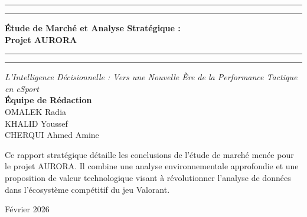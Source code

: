 \documentclass[a4paper,11pt]{article}
\begin{document}
\begin{titlepage}
    \centering
    \vspace*{1.5cm}
    \rule{\textwidth}{1.6pt}\vspace*{-\baselineskip}\vspace*{2pt}
    \rule{\textwidth}{0.4pt}
    \vspace{0.75cm}
    {\Huge \bfseries Étude de Marché et Analyse Stratégique : \\ \vspace{0.5cm} Projet AURORA} \\
    \vspace{0.75cm}
    \rule{\textwidth}{0.4pt}\vspace*{-\baselineskip}\vspace{3.2pt}
    \rule{\textwidth}{1.6pt}
    \vspace{1.5cm}
    {\large \textit{L'Intelligence Décisionnelle : Vers une Nouvelle Ère de la Performance Tactique en eSport}} \\
    \vfill
    {\large \textbf{Équipe de Rédaction}} \\
    \vspace{0.5cm}
    {\large OMALEK Radia \\ KHALID Youssef \\ CHERQUI Ahmed Amine} \\
    \vfill
    \begin{tcolorbox}[colback=white,colframe=academic-blue,arc=0mm,boxrule=0.5pt]
        \centering
        \small Ce rapport stratégique détaille les conclusions de l'étude de marché menée pour le projet AURORA. Il combine une analyse environnementale approfondie et une proposition de valeur technologique visant à révolutionner l'analyse de données dans l'écosystème compétitif du jeu Valorant.
    \end{tcolorbox}
    \vfill
    {\large Février 2026}
\end{titlepage}

\newpage
{}
\begin{abstract}
\noindent Ce document constitue une analyse exhaustive des opportunités et des défis liés au déploiement de la solution AURORA, une plateforme de "Decision Intelligence" dédiée à l'eSport professionnel. Dans un secteur où la data-visualisation et l'analyse prédictive deviennent des standards de performance, AURORA propose une rupture technologique majeure. En s'appuyant sur des algorithmes propriétaires de \textit{Computer Vision} et de \textit{Machine Learning}, notre solution transforme des flux vidéo bruts en indicateurs tactiques actionnables. L'étude présente un diagnostic PESTEL contrastant les opportunités du marché marocain et la maturité des marchés internationaux, suivi d'une analyse SWOT et d'une stratégie de segmentation (STP) rigoureuse. Enfin, le mix marketing opérationnel définit un modèle économique SaaS équilibré, conçu pour maximiser l'adoption tant chez les joueurs individuels que chez les structures professionnelles mondiales.
\end{abstract}
\end{document}
